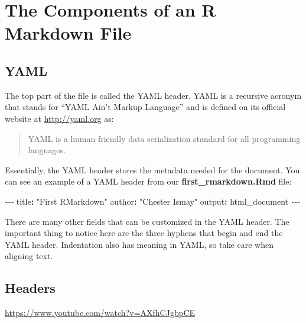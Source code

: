 \documentclass[]{tufte-book}
\newenvironment{Shaded}{\begin{snugshade}}{\end{snugshade}}
\newcommand{\AttributeTok}[1]{\textcolor[rgb]{0.77,0.63,0.00}{#1}}
\newcommand{\FunctionTok}[1]{\textcolor[rgb]{0.00,0.00,0.00}{#1}}
\newcommand{\KeywordTok}[1]{\textcolor[rgb]{0.13,0.29,0.53}{\textbf{#1}}}
\newcommand{\PreprocessorTok}[1]{\textcolor[rgb]{0.56,0.35,0.01}{\textit{#1}}}
\newcommand{\StringTok}[1]{\textcolor[rgb]{0.31,0.60,0.02}{#1}}
\begin{document}
\hypertarget{the-components-of-an-r-markdown-file}{%
\section{The Components of an R Markdown File}\label{the-components-of-an-r-markdown-file}}

\hypertarget{yaml}{%
\subsection{YAML}\label{yaml}}

The top part of the file is called the YAML header. YAML is a recursive acronym that stands for ``YAML Ain't Markup Language'' and is defined on its official website at \url{http://yaml.org} as:

\begin{quote}
YAML is a human friendly data serialization
standard for all programming languages.
\end{quote}

Essentially, the YAML header stores the metadata needed for the document. You can see an example of a YAML header from our \textbf{first\_rmarkdown.Rmd} file:

\begin{Shaded}
\begin{Highlighting}[]
\PreprocessorTok{{-}{-}{-}}
\FunctionTok{title}\KeywordTok{:}\AttributeTok{ }\StringTok{"First RMarkdown"}
\FunctionTok{author}\KeywordTok{:}\AttributeTok{ }\StringTok{"Chester Ismay"}
\FunctionTok{output}\KeywordTok{:}\AttributeTok{ html\_document}
\PreprocessorTok{{-}{-}{-}}
\end{Highlighting}
\end{Shaded}

There are many other fields that can be customized in the YAML header. The important thing to notice here are the three hyphens that begin and end the YAML header. Indentation also has meaning in YAML, so take care when aligning text.

\hypertarget{headers}{%
\subsection{Headers}\label{headers}}

\vspace{0.1in}\begin{center}\footnotesize{\url{https://www.youtube.com/watch?v=AXfhCJgbpCE}}\end{center}\vspace{0.1in}
\end{document}
